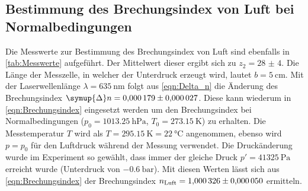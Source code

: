 \subsection{Bestimmung des Brechungsindex von Luft bei Normalbedingungen}
\label{subsec:A_Index_Luft}
Die Messwerte zur Bestimmung des Brechungsindex von Luft sind ebenfalls in \autoref{tab:Messwerte} aufgeführt. Der Mittelwert dieser ergibt sich zu $z_2 = \num{28(4)}$.
Die Länge der Messzelle, in welcher der Unterdruck erzeugt wird, lautet $b = \qty{5}{\centi\metre}$. Mit der Laserwellenlänge $\lambda = \qty{635}{\nano\metre}$ folgt aus
\autoref{eqn:Delta_n} die Änderung des Brechungsindex $\symup{\Delta}n = \num{0.000179+-0.000027}$. Diese kann wiederum in \autoref{eqn:Brechungsindex} eingesetzt werden um den
Brechungsindex bei Normalbedingungen ($p_0 = \qty{1013.25}{\hecto\pascal}$, $T_0 = \qty{273.15}{\kelvin}$) zu erhalten. Die Messtemperatur $T$ wird als 
$T = \qty{295.15}{\kelvin} = \qty{22}{\celsius}$ angenommen, ebenso wird $p = p_0$ für den Luftdruck während der Messung verwendet. Die Druckänderung wurde im Experiment so 
gewählt, dass immer der gleiche Druck $p' = \qty{41325}{\pascal}$ erreicht wurde (Unterdruck von $-\qty{0.6}{\bar}$). Mit diesen Werten lässt sich aus \autoref{eqn:Brechungsindex} 
der Brechungsindex $n_\text{Luft} = \num{1.000326+-0.00005}$ ermitteln.
